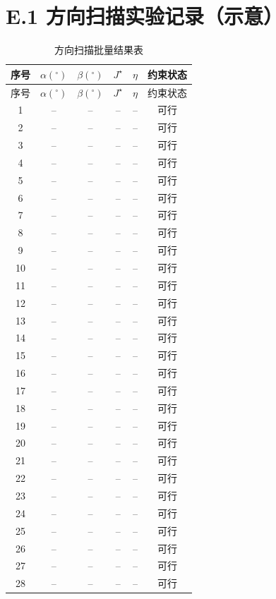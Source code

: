 \section*{E.1 方向扫描实验记录（示意）}
\small
\begin{longtable}{cccccc}
\caption{方向扫描批量结果表}\\
\toprule
序号 & $\alpha(^\circ)$ & $\beta(^\circ)$ & $J^\star$ & $\eta$ & 约束状态\\
\midrule
\endfirsthead
\toprule
序号 & $\alpha(^\circ)$ & $\beta(^\circ)$ & $J^\star$ & $\eta$ & 约束状态\\
\midrule
\endhead
1 & -- & -- & -- & -- & 可行\\
2 & -- & -- & -- & -- & 可行\\
3 & -- & -- & -- & -- & 可行\\
4 & -- & -- & -- & -- & 可行\\
5 & -- & -- & -- & -- & 可行\\
6 & -- & -- & -- & -- & 可行\\
7 & -- & -- & -- & -- & 可行\\
8 & -- & -- & -- & -- & 可行\\
9 & -- & -- & -- & -- & 可行\\
10 & -- & -- & -- & -- & 可行\\
11 & -- & -- & -- & -- & 可行\\
12 & -- & -- & -- & -- & 可行\\
13 & -- & -- & -- & -- & 可行\\
14 & -- & -- & -- & -- & 可行\\
15 & -- & -- & -- & -- & 可行\\
16 & -- & -- & -- & -- & 可行\\
17 & -- & -- & -- & -- & 可行\\
18 & -- & -- & -- & -- & 可行\\
19 & -- & -- & -- & -- & 可行\\
20 & -- & -- & -- & -- & 可行\\
21 & -- & -- & -- & -- & 可行\\
22 & -- & -- & -- & -- & 可行\\
23 & -- & -- & -- & -- & 可行\\
24 & -- & -- & -- & -- & 可行\\
25 & -- & -- & -- & -- & 可行\\
26 & -- & -- & -- & -- & 可行\\
27 & -- & -- & -- & -- & 可行\\
28 & -- & -- & -- & -- & 可行\\

\end{longtable}
